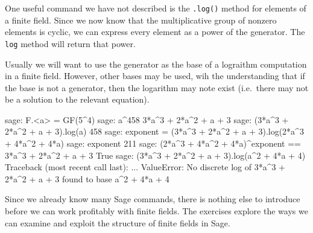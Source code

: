 %
One useful command we have not described is the \verb?.log()? method for elements of a finite field.  Since we now know that the multiplicative group of nonzero elements is cyclic, we can express every element as a power of the generator.  The \verb?log? method will return that power.\par
%
Usually we will want to use the generator as the base of a lograithm computation in a finite field.  However, other bases may be used, wih the understanding that if the base is not a generator, then the logarithm may note exist (i.e.\ there may not be a solution to the relevant equation).
%
\begin{sageexample}
sage: F.<a> = GF(5^4)
sage: a^458
3*a^3 + 2*a^2 + a + 3
sage: (3*a^3 + 2*a^2 + a + 3).log(a)
458
sage: exponent = (3*a^3 + 2*a^2 + a + 3).log(2*a^3 + 4*a^2 + 4*a)
sage: exponent
211
sage: (2*a^3 + 4*a^2 + 4*a)^exponent == 3*a^3 + 2*a^2 + a + 3
True
sage: (3*a^3 + 2*a^2 + a + 3).log(a^2 + 4*a + 4)
Traceback (most recent call last):
...
ValueError: No discrete log of 3*a^3 + 2*a^2 + a + 3 found
to base a^2 + 4*a + 4
\end{sageexample}
%
Since we already know many Sage commands, there is nothing else to introduce before we can work profitably with finite fields.  The exercises explore the ways we can examine and exploit the structure of finite fields in Sage.
%
